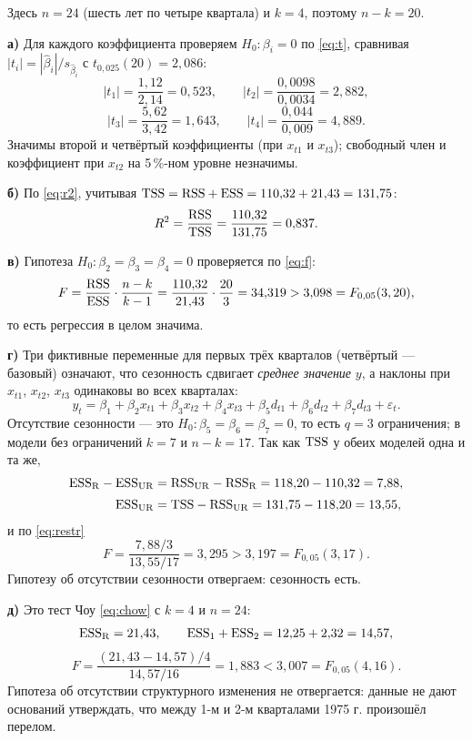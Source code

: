 \begin{solution}
Здесь $n = 24$ (шесть лет по четыре квартала) и $k = 4$, поэтому $n - k = 20$.

\medskip
\textbf{а)} Для каждого коэффициента проверяем $H_0\colon \beta_i = 0$ по
\eqref{eq:t}, сравнивая $|t_i| = |\widehat{\beta}_i|/s_{\widehat{\beta}_i}$ с
$t_{0{,}025}(20) = 2{,}086$:
\[
  |t_1| = \frac{1{,}12}{2{,}14} = 0{,}523,
  \qquad
  |t_2| = \frac{0{,}0098}{0{,}0034} = 2{,}882,
\]
\[
  |t_3| = \frac{5{,}62}{3{,}42} = 1{,}643,
  \qquad
  |t_4| = \frac{0{,}044}{0{,}009} = 4{,}889 .
\]
Значимы второй и четвёртый коэффициенты (при $x_{t1}$ и $x_{t3}$); свободный
член и коэффициент при $x_{t2}$ на 5\,\%-ном уровне незначимы.

\medskip
\textbf{б)} По \eqref{eq:r2}, учитывая $\mathrm{TSS} = \mathrm{RSS} + \mathrm{ESS} = 110{,}32 + 21{,}43
= 131{,}75$:
\[
  R^2 = \frac{\mathrm{RSS}}{\mathrm{TSS}} = \frac{110{,}32}{131{,}75} = 0{,}837 .
\]

\medskip
\textbf{в)} Гипотеза $H_0\colon \beta_2 = \beta_3 = \beta_4 = 0$ проверяется по
\eqref{eq:f}:
\[
  F = \frac{\mathrm{RSS}}{\mathrm{ESS}}\cdot\frac{n-k}{k-1}
    = \frac{110{,}32}{21{,}43}\cdot\frac{20}{3}
    = 34{,}319 > 3{,}098 = F_{0{,}05}(3, 20),
\]
то есть регрессия в целом значима.

\medskip
\textbf{г)} Три фиктивные переменные для первых трёх кварталов (четвёртый —
базовый) означают, что сезонность сдвигает \emph{среднее значение} $y$, а
наклоны при $x_{t1}$, $x_{t2}$, $x_{t3}$ одинаковы во всех кварталах:
\[
  y_t = \beta_1 + \beta_2x_{t1} + \beta_3x_{t2} + \beta_4x_{t3}
        + \beta_5d_{t1} + \beta_6d_{t2} + \beta_7d_{t3} + \varepsilon_t .
\]
Отсутствие сезонности — это $H_0\colon \beta_5 = \beta_6 = \beta_7 = 0$, то есть
$q = 3$ ограничения; в модели без ограничений $k = 7$ и $n - k = 17$. Так как
$\mathrm{TSS}$ у обеих моделей одна и та же,
\[
\begin{aligned}
  \mathrm{ESS}_{\mathrm{R}} - \mathrm{ESS}_{\mathrm{UR}}
  &= \mathrm{RSS}_{\mathrm{UR}} - \mathrm{RSS}_{\mathrm{R}} = 118{,}20 - 110{,}32 = 7{,}88, \\[2pt]
  \mathrm{ESS}_{\mathrm{UR}} &= \mathrm{TSS} - \mathrm{RSS}_{\mathrm{UR}} = 131{,}75 - 118{,}20 = 13{,}55,
\end{aligned}
\]
и по \eqref{eq:restr}
\[
  F = \frac{7{,}88/3}{13{,}55/17} = 3{,}295 > 3{,}197 = F_{0{,}05}(3, 17).
\]
Гипотезу об отсутствии сезонности отвергаем: сезонность есть.

\medskip
\textbf{д)} Это тест Чоу \eqref{eq:chow} с $k = 4$ и $n = 24$:
\[
  \mathrm{ESS}_{\mathrm{R}} = 21{,}43,
  \qquad
  \mathrm{ESS}_1 + \mathrm{ESS}_2 = 12{,}25 + 2{,}32 = 14{,}57,
\]
\[
  F = \frac{(21{,}43 - 14{,}57)/4}{14{,}57/16} = 1{,}883 < 3{,}007 = F_{0{,}05}(4, 16).
\]
Гипотеза об отсутствии структурного изменения не отвергается: данные не дают
оснований утверждать, что между 1-м и 2-м кварталами 1975 г. произошёл перелом.
\end{solution}


